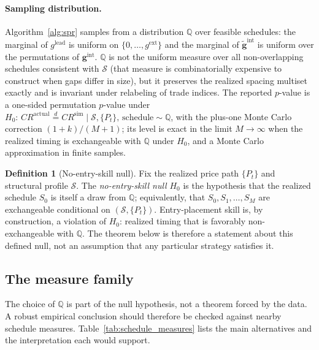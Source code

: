 \documentclass[preprint,12pt]{elsarticle}
\theoremstyle{definition}
\newtheorem{definition}{Definition}
\begin{document}
\paragraph{Sampling distribution.} Algorithm~\ref{alg:spr} samples from a distribution $\mathbb{Q}$ over feasible schedules: the marginal of $g^{\mathrm{lead}}$ is uniform on $\{0,\ldots,g^{\mathrm{ext}}\}$ and the marginal of $\tilde{\mathbf{g}}^{\mathrm{int}}$ is uniform over the permutations of $\mathbf{g}^{\mathrm{int}}$. $\mathbb{Q}$ is not the uniform measure over all non-overlapping schedules consistent with $\mathcal{S}$ (that measure is combinatorially expensive to construct when gaps differ in size), but it preserves the realized spacing multiset exactly and is invariant under relabeling of trade indices. The reported $p$-value is a one-sided permutation $p$-value under $H_0:\,CR^{\mathrm{actual}}\stackrel{d}{=}CR^{\mathrm{sim}}\mid \mathcal{S}, \{P_t\},\,\text{schedule}\sim\mathbb{Q}$, with the plus-one Monte Carlo correction $(1+k)/(M+1)$; its level is exact in the limit $M\to\infty$ when the realized timing is exchangeable with $\mathbb{Q}$ under $H_0$, and a Monte Carlo approximation in finite samples.

\begin{definition}[No-entry-skill null]
\label{def:h0}
Fix the realized price path $\{P_t\}$ and structural profile $\mathcal{S}$. The \emph{no-entry-skill null} $H_0$ is the hypothesis that the realized schedule $S_0$ is itself a draw from $\mathbb{Q}$; equivalently, that $S_0,S_1,\ldots,S_M$ are exchangeable conditional on $(\mathcal{S},\{P_t\})$. Entry-placement skill is, by construction, a violation of $H_0$: realized timing that is favorably non-exchangeable with $\mathbb{Q}$. The theorem below is therefore a statement about this defined null, not an assumption that any particular strategy satisfies it.
\end{definition}

\subsection{The measure family}

The choice of $\mathbb{Q}$ is part of the null hypothesis, not a theorem forced by the data. A robust empirical conclusion should therefore be checked against nearby schedule measures. Table~\ref{tab:schedule_measures} lists the main alternatives and the interpretation each would support.
\end{document}
